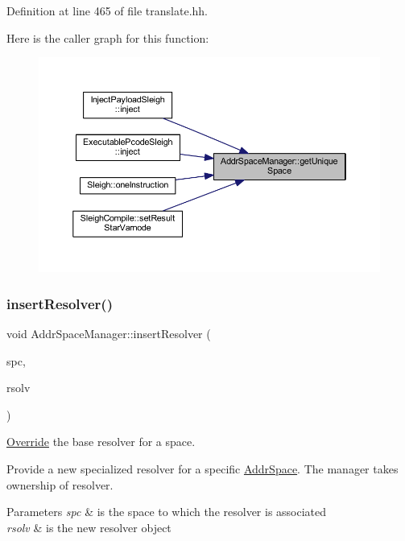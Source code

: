 Definition at line 465 of file translate.\+hh.

Here is the caller graph for this function\+:
\nopagebreak
\begin{figure}[H]
\begin{center}
\leavevmode
\includegraphics[width=350pt]{class_addr_space_manager_ab7428d74e76200ecc3c99a0e1ad7f613_icgraph}
\end{center}
\end{figure}
\mbox{\label{class_addr_space_manager_a6330481f1f40a24d860c820a5a2b64f5}} 
\subsubsection{\texorpdfstring{insertResolver()}{insertResolver()}}
{\footnotesize\ttfamily void Addr\+Space\+Manager\+::insert\+Resolver (\begin{DoxyParamCaption}\item[{\mbox{\hyperlink{class_addr_space}{Addr\+Space}} $\ast$}]{spc,  }\item[{\mbox{\hyperlink{class_address_resolver}{Address\+Resolver}} $\ast$}]{rsolv }\end{DoxyParamCaption})\hspace{0.3cm}{\ttfamily [protected]}}



\mbox{\hyperlink{class_override}{Override}} the base resolver for a space. 

Provide a new specialized resolver for a specific \mbox{\hyperlink{class_addr_space}{Addr\+Space}}. The manager takes ownership of resolver. 
\begin{DoxyParams}{Parameters}
{\em spc} & is the space to which the resolver is associated \\
\hline
{\em rsolv} & is the new resolver object \\
\hline
\end{DoxyParams}


